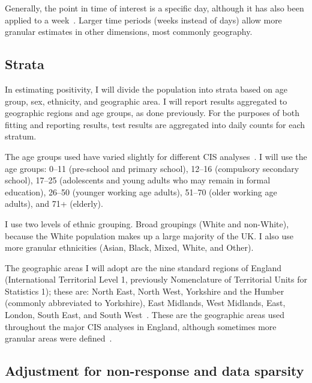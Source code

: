 \documentclass[thesis.tex]{subfiles}
\begin{document}
Generally, the point in time of interest is a specific day, although it has also been applied to a week~\autocite{cisMethodsONS,pouwelsMRPvaccination,pouwelsCommunity}.
Larger time periods (\ie weeks instead of days) allow more granular estimates in other dimensions, most commonly geography.

\subsection{Strata} \label{biology-data:sec:cis-strata}

In estimating positivity, I will divide the population into strata based on age group, sex, ethnicity, and geographic area.
I will report results aggregated to geographic regions and age groups, as done previously.
For the purposes of both fitting and reporting results, test results are aggregated into daily counts for each stratum.

The age groups used have varied slightly for different CIS analyses~\autocite[e.g.][]{pouwelsMRPvaccination,pouwelsCommunity,cisMethodsONS,houseInferring,walkerTracking}.
I will use the age groups: 0--11 (pre-school and primary school), 12--16 (compulsory secondary school), 17--25 (adolescents and young adults who may remain in formal education), 26--50 (younger working age adults), 51--70 (older working age adults), and 71+ (elderly).

I use two levels of ethnic grouping.
Broad groupings (White and non-White), because the White population makes up a large majority of the UK.
I also use more granular ethnicities (Asian, Black, Mixed, White, and Other).

The geographic areas I will adopt are the nine standard regions of England (International Territorial Level 1, previously Nomenclature of Territorial Units for Statistics 1); these are: North East, North West, Yorkshire and the Humber (commonly abbreviated to Yorkshire), East Midlands, West Midlands, East, London, South East, and South West~\autocite{onsRegions}.
These are the geographic areas used throughout the major CIS analyses in England, although sometimes more granular areas were defined~\autocite[e.g.][]{pouwelsMRPvaccination,pouwelsCommunity,cisMethodsONS,houseInferring,walkerTracking}.

\subsection{Adjustment for non-response and data sparsity} \label{biology-data:sec:MRP}
\end{document}
